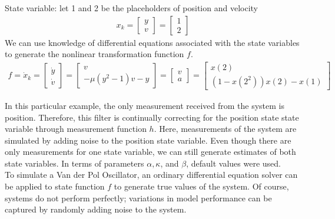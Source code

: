 \newpage

\noindent State variable: let 1 and 2 be the placeholders of position and velocity
\begin{align*}
x_k = \begin{bmatrix}
          y\\ 
          v
           \end{bmatrix}  =
           \begin{bmatrix}
           1 \\
           2
           \end{bmatrix}
\end{align*}
We can use knowledge of differential equations associated with the state variables to generate the nonlinear transformation function $f$. 
\begin{align*}
f = \dot x_k  = \begin{bmatrix}
          \dot y \\
           \dot v
           \end{bmatrix}  =
           \begin{bmatrix}
           v \\
           -\mu (y^2 - 1)v - y 
           \end{bmatrix}=
           \begin{bmatrix}
           v \\
           a
           \end{bmatrix} =
           \begin{bmatrix}
           x(2) \\
          ( 1-x(2^2))x(2) - x(1)
           \end{bmatrix}
\end{align*}


\noindent In this particular example, the only measurement received from the system is position. Therefore, this filter is continually correcting for the position state state variable through measurement function $h$. Here, measurements of the system are simulated by adding noise to the position state variable. Even though there are only measurements for one state variable, we can still generate estimates of both state variables. In terms of parameters $\alpha, \kappa$, and $\beta$, default values were used.\\ 

\noindent To simulate a Van der Pol Oscillator, an ordinary differential equation solver can be applied to state function $f$ to generate true values of the system. Of course, systems do not perform perfectly; variations in model performance can be captured by randomly adding noise to the system. \\

